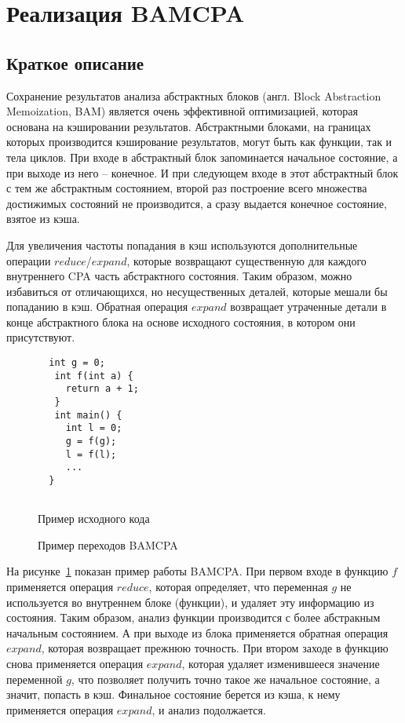 \section{Реализация BAMCPA}
\label{sect_impl_bam}

\subsection{Краткое описание}
Сохранение результатов анализа абстрактных блоков (англ. Block Abstraction Memoization, BAM) является очень эффективной оптимизацией, которая основана на кэшировании результатов. 
Абстрактными блоками, на границах которых производится кэширование результатов, могут быть как функции, так и тела циклов. 
При входе в абстрактный блок запоминается начальное состояние, а при выходе из него -- конечное.
И при следующем входе в этот абстрактный блок с тем же абстрактным состоянием, второй раз построение всего множества достижимых состояний не производится, а сразу выдается конечное состояние, взятое из кэша.

Для увеличения частоты попадания в кэш используются дополнительные операции $reduce$/$expand$, которые возвращают существенную для каждого внутреннего CPA часть абстрактного состояния.
Таким образом, можно избавиться от отличающихся, но несущественных деталей, которые мешали бы попаданию в кэш.
Обратная операция $expand$ возвращает утраченные детали в конце абстрактного блока на основе исходного состояния, в котором они присутствуют.

\begin{figure}[h]
\begin{minipage}[h]{0.3\textwidth}
\begin{verbatim}
  int g = 0;
   int f(int a) {
     return a + 1;
   }
   int main() {
     int l = 0;
     g = f(g);
     l = f(l);
     ...
  }
  
\end{verbatim}
\caption{Пример исходного кода}
\label{BAMCodeExample}
\end{minipage}
\hfill
\begin{minipage}{0.6\textwidth}
    \caption{Пример переходов BAMCPA}
    \label{img:BAMCPA}
\end{minipage}
\end{figure}

На рисунке~\ref{img:BAMCPA} показан пример работы BAMCPA.
При первом входе в функцию $f$ применяется операция $reduce$, которая определяет, что переменная $g$ не используется во внутреннем блоке (функции), и удаляет эту информацию из состояния. 
Таким образом, анализ функции производится с более абстракным начальным состоянием.
А при выходе из блока применяется обратная операция $expand$, которая возвращает прежнюю точность.
При втором заходе в функцию снова применяется операция $expand$, которая удаляет изменившееся значение переменной $g$, что позволяет получить точно такое же начальное состояние, а значит, попасть в кэш. 
Финальное состояние берется из кэша, к нему применяется операция $expand$, и анализ подолжается.

